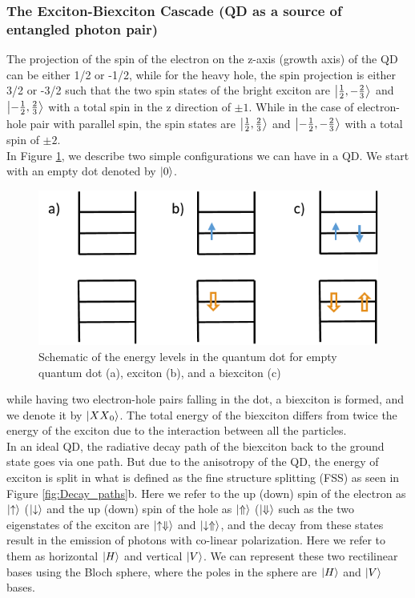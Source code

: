 \subsubsection{The Exciton-Biexciton Cascade (QD as a source of entangled photon pair)}\label{biexciton-exciton-chapter}
The projection of the spin of the electron on the z-axis (growth axis) of the QD can be either 1/2 or -1/2, while for the heavy hole, the spin 
 projection is either 3/2 or -3/2 such that the two spin states of the bright exciton are $\ket{\frac{1}{2},-\frac{2}{3}}$ and $\ket{-\frac{1}
 {2},\frac{2}{3}}$  with a total spin in the z direction  of $\pm1$. While in the case of electron-hole pair with parallel spin, the spin states are $\ket{\frac{1}{2},\frac{2}{3}}$ and $\ket{-\frac{1}{2},-\frac{2}{3}}$ with a total spin of $\pm2$.\\
	In Figure \ref{fig:energy_levels}, we describe two simple configurations we can have in a QD. We start with an empty dot denoted by $\ket{0}$.
	\begin{figure}[H]
		\centering
		\includegraphics[scale=1]{figures/energy-levels.png}
		\caption{Schematic of the energy levels in the quantum dot for empty quantum dot (a), exciton (b), and a biexciton (c)}
		\label{fig:energy_levels}
	\end{figure}
	while having two electron-hole pairs falling in the dot, a biexciton is formed, and we denote it by $\ket{{XX}_0}$. The total energy of the biexciton differs from twice the energy of the exciton due to the interaction between all the particles.\\
	In an ideal QD, the radiative decay path of the biexciton back to the ground state goes via one path. But due to the anisotropy of the QD, the energy of exciton is split in what is defined as the fine structure splitting (FSS) as seen in Figure \ref{fig:Decay_paths}b. Here we refer to the up (down) spin of the electron as $\ket{\uparrow}$ ($\ket{\downarrow}$ and the up (down) spin of the hole as $\ket{\Uparrow}$ ($\ket{\Downarrow}$ such as the two eigenstates of the exciton are  $\ket{\uparrow\Downarrow}$ and $\ket{\downarrow\Uparrow}$, and the decay from these states result in the emission of photons with co-linear polarization. Here we refer to them as horizontal $\ket{H}$ and vertical $\ket{V}$. We can represent these two rectilinear bases using the Bloch sphere, where the poles in the sphere are $\ket{H}$ and $\ket{V}$ bases.\\
